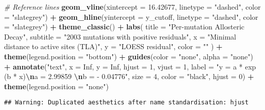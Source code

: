 \documentclass[
]{article}
\newenvironment{Shaded}{\begin{snugshade}}{\end{snugshade}}
\newcommand{\AttributeTok}[1]{\textcolor[rgb]{0.13,0.29,0.53}{#1}}
\newcommand{\CommentTok}[1]{\textcolor[rgb]{0.56,0.35,0.01}{\textit{#1}}}
\newcommand{\ConstantTok}[1]{\textcolor[rgb]{0.56,0.35,0.01}{#1}}
\newcommand{\DecValTok}[1]{\textcolor[rgb]{0.00,0.00,0.81}{#1}}
\newcommand{\FloatTok}[1]{\textcolor[rgb]{0.00,0.00,0.81}{#1}}
\newcommand{\FunctionTok}[1]{\textcolor[rgb]{0.13,0.29,0.53}{\textbf{#1}}}
\newcommand{\NormalTok}[1]{#1}
\newcommand{\SpecialCharTok}[1]{\textcolor[rgb]{0.81,0.36,0.00}{\textbf{#1}}}
\newcommand{\StringTok}[1]{\textcolor[rgb]{0.31,0.60,0.02}{#1}}
\begin{document}
\begin{Shaded}
\begin{Highlighting}[]
  \CommentTok{\# Reference lines}
  \FunctionTok{geom\_vline}\NormalTok{(}\AttributeTok{xintercept =} \FloatTok{16.42677}\NormalTok{, }\AttributeTok{linetype =} \StringTok{"dashed"}\NormalTok{, }\AttributeTok{color =} \StringTok{"slategrey"}\NormalTok{) }\SpecialCharTok{+}
  \FunctionTok{geom\_hline}\NormalTok{(}\AttributeTok{yintercept =}\NormalTok{ y\_cutoff, }\AttributeTok{linetype =} \StringTok{"dashed"}\NormalTok{, }\AttributeTok{color =} \StringTok{"slategrey"}\NormalTok{) }\SpecialCharTok{+}
  \FunctionTok{theme\_classic}\NormalTok{() }\SpecialCharTok{+}
  \FunctionTok{labs}\NormalTok{(}
    \AttributeTok{title =} \StringTok{"Per{-}mutation Allosteric Decay"}\NormalTok{,}
    \AttributeTok{subtitle =} \StringTok{"2003 mutations with positive residuals"}\NormalTok{,}
    \AttributeTok{x =} \StringTok{"Minimal distance to active sites (TLA)"}\NormalTok{,}
    \AttributeTok{y =} \StringTok{"LOESS residual"}\NormalTok{,}
    \AttributeTok{color =} \StringTok{""}
\NormalTok{  ) }\SpecialCharTok{+} \FunctionTok{theme}\NormalTok{(}\AttributeTok{legend.position =} \StringTok{"bottom"}\NormalTok{) }\SpecialCharTok{+} \FunctionTok{guides}\NormalTok{(}\AttributeTok{color =} \StringTok{"none"}\NormalTok{, }\AttributeTok{alpha =} \StringTok{"none"}\NormalTok{) }\SpecialCharTok{+}
    \FunctionTok{annotate}\NormalTok{(}\StringTok{"text"}\NormalTok{,  }\AttributeTok{x =} \ConstantTok{Inf}\NormalTok{, }\AttributeTok{y =} \ConstantTok{Inf}\NormalTok{,}
             \AttributeTok{hjust =} \DecValTok{1}\NormalTok{, }\AttributeTok{vjust =} \DecValTok{1}\NormalTok{,}
           \AttributeTok{label =} \StringTok{"y = a * exp (b * x)}\SpecialCharTok{\textbackslash{}n}\StringTok{a = 2.99859 }\SpecialCharTok{\textbackslash{}n}\StringTok{b = {-} 0.04776"}\NormalTok{,}
           \AttributeTok{size =} \DecValTok{4}\NormalTok{, }\AttributeTok{color =} \StringTok{"black"}\NormalTok{, }\AttributeTok{hjust =} \DecValTok{0}\NormalTok{) }\SpecialCharTok{+} \FunctionTok{theme}\NormalTok{(}\AttributeTok{legend.position =} \StringTok{"none"}\NormalTok{)}
\end{Highlighting}
\end{Shaded}

\begin{verbatim}
## Warning: Duplicated aesthetics after name standardisation: hjust
\end{verbatim}
\end{document}
